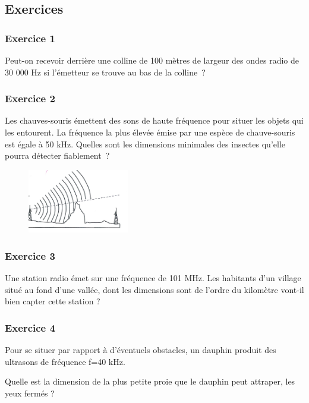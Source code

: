 \subsection{Exercices}

\subsubsection{Exercice 1}

Peut-on recevoir derrière une colline de 100
mètres de largeur des ondes radio de 30 000 Hz si l'émetteur se trouve
au bas de la colline~?

\subsubsection{Exercice 2}
Les chauves-souris émettent des sons de haute fréquence pour situer les
objets qui les entourent. La fréquence la plus élevée émise par une
espèce de chauve-souris est égale à 50 kHz. Quelles sont les dimensions
minimales des insectes qu'elle pourra détecter fiablement~?

\begin{figure}
\centering
\includegraphics[width=4.445cm,height=2.787cm]{Pictures/10000001000002E4000001CE9CDB74834F100431.png}
\caption{}
\end{figure}

\subsubsection{Exercice 3}

Une station radio émet sur une fréquence de 101 MHz.
Les habitants d'un village situé au fond d'une vallée, dont les
dimensions sont de l'ordre du kilomètre vont-il bien capter cette
station ?

\subsubsection{Exercice 4}
Pour se situer par rapport à d'éventuels obstacles, un dauphin produit
des ultrasons de fréquence f=40 kHz.

Quelle est la dimension de la plus petite proie que le dauphin peut
attraper, les yeux fermés ?

